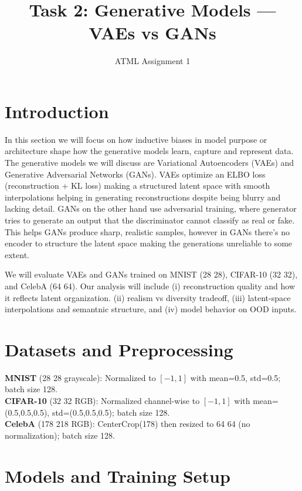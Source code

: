 \documentclass[twocolumn]{article}
\begin{document}
\title{Task 2: Generative Models --- VAEs vs GANs}
\author{ATML Assignment 1}
\maketitle

\section{Introduction}
In this section we will focus on how inductive biases in model purpose or architecture shape how the generative models learn, capture and represent data. The generative models we will discuss are Variational Autoencoders (VAEs) and Generative Adversarial Networks (GANs). VAEs optimize an ELBO loss (reconstruction + KL loss) making a structured latent space with smooth interpolations helping in generating reconstructions despite being blurry and lacking detail. GANs on the other hand use adversarial training, where generator tries to generate an output that the discriminator cannot classify as real or fake. This helps GANs produce sharp, realistic samples, however in GANs there’s no encoder to structure the latent space making the generations unreliable to some extent. 

We will evaluate VAEs and GANs trained on MNIST (28\,\texttimes\,28), CIFAR-10 (32\,\texttimes\,32), and CelebA (64\,\texttimes\,64). Our analysis will include (i) reconstruction quality and how it reflects latent organization. (ii) realism vs diversity tradeoff, (iii) latent-space interpolations and semantnic structure, and (iv) model behavior on OOD inputs.

\section{Datasets and Preprocessing}
\textbf{MNIST} (28\,\texttimes\,28 grayscale): Normalized to $[-1,1]$ with mean=0.5, std=0.5; batch size 128.\\
\textbf{CIFAR-10} (32\,\texttimes\,32 RGB): Normalized channel-wise to $[-1,1]$ with mean=(0.5,0.5,0.5), std=(0.5,0.5,0.5); batch size 128.\\
\textbf{CelebA} (178\,\texttimes\,218 RGB): CenterCrop(178) then resized to 64\,\texttimes\,64 (no normalization); batch size 128.

\section{Models and Training Setup}
\end{document}
